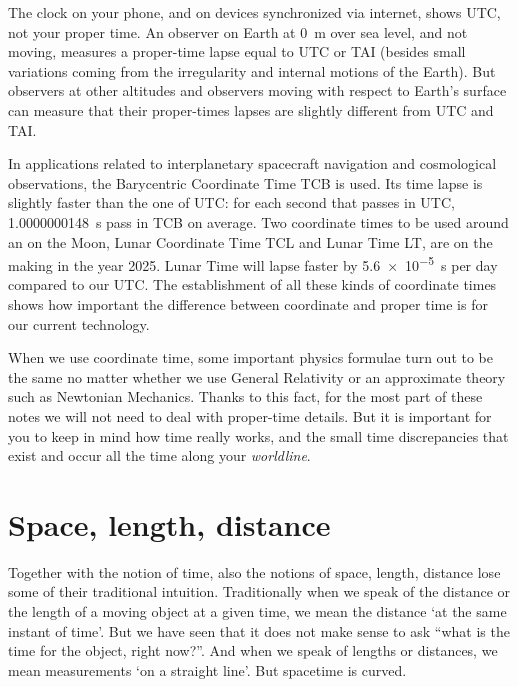 \documentclass[a4paper,12pt,%
onecolumn,oneside,%
british%
]{memoir}
\providecommand{\href}[2]{#2}
\renewcommand*{\|}[1][]{\nonscript\:#1\vert\nonscript\:\mathopen{}}
\newcommand*{\furl}[2]{\href{#1}{#2}\pagenote{\url{#1}}}
\begin{document}
The clock on your phone, and on devices synchronized via internet, shows UTC, not your proper time. An observer on Earth at \qty{0}{m} over sea level, and not moving, measures a proper-time lapse equal to UTC or TAI (besides small variations coming from the irregularity and internal motions of the Earth). But observers at other altitudes and observers moving with respect to Earth's surface can measure that their proper-times lapses are slightly different from UTC and TAI.

\medskip

In applications related to interplanetary spacecraft navigation and cosmological observations, the Barycentric Coordinate Time TCB is used. Its time lapse is slightly faster than the one of UTC: for each second that passes in UTC, \qty{1.0000000148}{s} pass in TCB on average. Two coordinate times to be used around an on the Moon, \furl{https://doi.org/10.1103/Physics.17.140}{Lunar Coordinate Time TCL} and Lunar Time LT, are on the making in the year 2025. Lunar Time will lapse faster by \qty{5.6e-5}{s} per day compared to our UTC. The establishment of all these kinds of coordinate times shows how important the difference between coordinate and proper time is for our current technology.

\medskip

When we use coordinate time, some important physics formulae turn out to be the same no matter whether we use General Relativity or an approximate theory such as Newtonian Mechanics. Thanks to this fact, for the most part of these notes we will not need to deal with proper-time details. But it is important for you to keep in mind how time really works, and the small time discrepancies that exist and occur all the time along your \emph{worldline}.



\section{Space, length, distance}
\label{sec:difficulties_distance}

Together with the notion of time, also the notions of space, length, distance lose some of their traditional intuition. Traditionally when we speak of the distance or the length of a moving object at a given time, we mean the distance \enquote*{at the same instant of time}. But we have seen that it does not make sense to ask \enquote{what is the time for the object, right now?}. And when we speak of lengths or distances, we mean measurements \enquote*{on a straight line}. But spacetime is curved.
\end{document}
